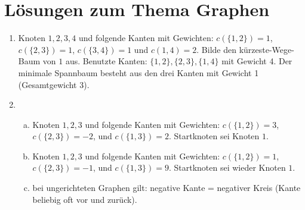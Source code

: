 \documentclass{scrartcl}
\begin{document}
\section*{Lösungen zum Thema Graphen}
\begin{enumerate}[(1)]

\item Knoten $1,2,3,4$ und folgende Kanten mit Gewichten: $c(\{1,2\})=1$, $c(\{2,3\})=1$, $c(\{3,4\})=1$ und $c({1,4})=2$.
Bilde den k\"urzeste-Wege-Baum von $1$ aus. Benutzte Kanten: $\{1,2\}, \{2,3\}, \{1,4\}$ mit Gewicht 4.
Der minimale Spannbaum besteht aus den drei Kanten mit Gewicht 1 (Gesamtgewicht 3).

\item \begin{enumerate}[(a)]
\item Knoten $1,2,3$ und folgende Kanten mit Gewichten: $c(\{1,2\})=3$, $c(\{2,3\})=-2$, und $c(\{1,3\})=2$. Startknoten sei Knoten $1$.
\item Knoten $1,2,3$ und folgende Kanten mit Gewichten: $c(\{1,2\})=1$, $c(\{2,3\})=-1$, und $c(\{1,3\})=9$. Startknoten sei wieder Knoten $1$.
\item bei ungerichteten Graphen gilt: negative Kante = negativer Kreis (Kante beliebig oft vor und zur\"uck).
\end{enumerate}

\end{enumerate}
\end{document}
